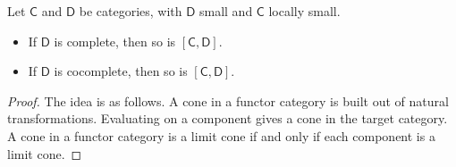 \documentclass[main.tex]{subfiles}
\begin{document}
\begin{theorem}
  Let $\mathsf{C}$ and $\mathsf{D}$ be categories, with $\mathsf{D}$ small and $\mathsf{C}$ locally small.
  \begin{itemize}
    \item If $\mathsf{D}$ is complete, then so is $[\mathsf{C}, \mathsf{D}]$.

    \item If $\mathsf{D}$ is cocomplete, then so is $[\mathsf{C}, \mathsf{D}]$.
  \end{itemize}
\end{theorem}
\begin{proof}
  The idea is as follows. A cone in a functor category is built out of natural transformations. Evaluating on a component gives a cone in the target category. A cone in a functor category is a limit cone if and only if each component is a limit cone.
\end{proof}
\end{document}

